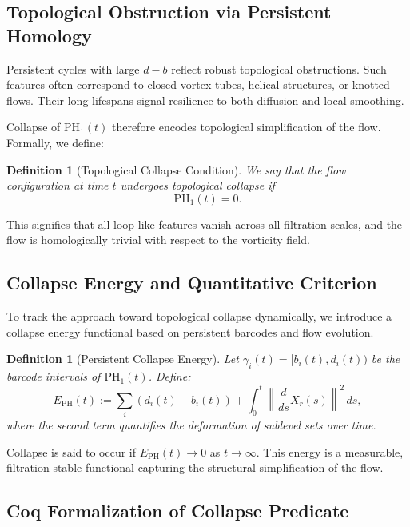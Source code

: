 \documentclass[11pt]{article}
\newtheorem{definition}[theorem]{Definition}
\begin{document}
\subsection{Topological Obstruction via Persistent Homology}

Persistent cycles with large \( d-b \) reflect robust topological obstructions. Such features often correspond to closed vortex tubes, helical structures, or knotted flows. Their long lifespans signal resilience to both diffusion and local smoothing.

Collapse of \( \mathrm{PH}_1(t) \) therefore encodes topological simplification of the flow. Formally, we define:

\begin{definition}[Topological Collapse Condition]
We say that the flow configuration at time \( t \) undergoes \emph{topological collapse} if
\[
\mathrm{PH}_1(t) = 0.
\]
\end{definition}

This signifies that all loop-like features vanish across all filtration scales, and the flow is homologically trivial with respect to the vorticity field.

\subsection{Collapse Energy and Quantitative Criterion}

To track the approach toward topological collapse dynamically, we introduce a collapse energy functional based on persistent barcodes and flow evolution.

\begin{definition}[Persistent Collapse Energy]
Let \( \gamma_i(t) = [b_i(t), d_i(t)) \) be the barcode intervals of \( \mathrm{PH}_1(t) \). Define:
\begin{equation}
E_{\mathrm{PH}}(t) := \sum_i (d_i(t) - b_i(t)) + \int_0^t \left\| \frac{d}{ds} X_r(s) \right\|^2 \, ds,
\end{equation}
where the second term quantifies the deformation of sublevel sets over time.
\end{definition}

Collapse is said to occur if \( E_{\mathrm{PH}}(t) \to 0 \) as \( t \to \infty \). This energy is a measurable, filtration-stable functional capturing the structural simplification of the flow.

\subsection{Coq Formalization of Collapse Predicate}
\end{document}
